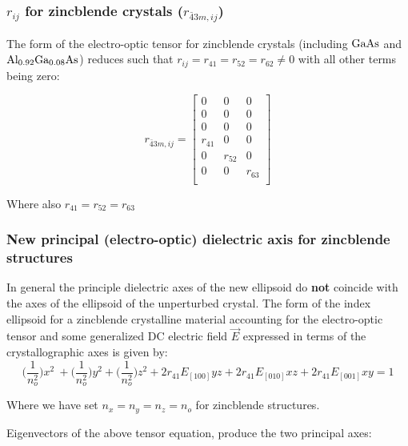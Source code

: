 
\subsubsection{$r_{ij}$ for zincblende crystals ($r_{\bar{4}3m, ij}$)}

The form of the electro-optic tensor for zincblende crystals (including $\mathrm{GaAs}$ and $\mathrm{Al_{0.92}Ga_{0.08}As}$) reduces such that $r_{ij} = r_{41} = r_{52} = r_{62} \neq 0$ with all other terms being zero:

\begin{equation}
r_{\bar{4}3m,ij} =
 \left[ {\begin{array}{ccc}
  0 & 0 & 0\\
  0 & 0 & 0\\
  0 & 0 & 0\\
  r_{41} & 0 & 0\\
  0 & r_{52} & 0\\
  0 & 0 & r_{63}\\
 \end{array}} \right]
\end{equation}

\noindent Where also $r_{41} = r_{52} = r_{63}$

\subsubsection{New principal (electro-optic) dielectric axis for zincblende structures}

In general the principle dielectric axes of the new ellipsoid do \textbf{not} coincide with the axes of the ellipsoid of the unperturbed crystal. The form of the index ellipsoid for a zincblende crystalline material accounting for the electro-optic tensor and some generalized DC electric field $\vec{E}$ expressed in terms of the crystallographic axes is given by:
\begin{equation}\label{eq:zindicatrix}
\bigg(\frac{1}{n_o^2} \bigg) x^2\ + \bigg(\frac{1}{n_o^2} \bigg) y^2 + \bigg(\frac{1}{n_o^2} \bigg) z^2  + 2r_{41} E_{[100]} yz + 2r_{41} E_{[010]} xz + 2r_{41}E_{[001]} xy= 1
\end{equation}

\noindent Where we have set $n_x = n_y = n_z = n_o$ for zincblende structures.

\noindent Eigenvectors of the above tensor equation, produce the two principal axes:	

